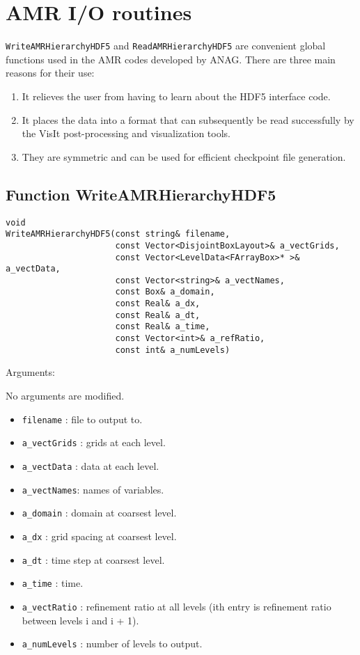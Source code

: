 \section{AMR I/O routines}

\protect\verb|WriteAMRHierarchyHDF5| and  \protect\verb|ReadAMRHierarchyHDF5|
are convenient global functions used in the AMR codes
developed by ANAG.  There are three main reasons for their
use: 

\begin{enumerate}
\item It relieves the user from having to learn about
the HDF5 interface code.
\item It places the data into a format that can subsequently
be read successfully by the VisIt post-processing and visualization 
tools.
\item They are symmetric and can be used for efficient checkpoint
file generation.
\end{enumerate}


\subsection{Function WriteAMRHierarchyHDF5}

\begin{verbatim}
void
WriteAMRHierarchyHDF5(const string& filename, 
                      const Vector<DisjointBoxLayout>& a_vectGrids, 
                      const Vector<LevelData<FArrayBox>* >& a_vectData,
                      const Vector<string>& a_vectNames,
                      const Box& a_domain,                               
                      const Real& a_dx,  
                      const Real& a_dt,
                      const Real& a_time,
                      const Vector<int>& a_refRatio,
                      const int& a_numLevels)
\end{verbatim}

Arguments:

No arguments are modified.
\begin{itemize}
\item \verb|filename| :  file to output to.
\item \verb|a_vectGrids| : grids at each level.
\item \verb|a_vectData| :  data at each level.
\item \verb|a_vectNames|:  names of variables.
\item \verb|a_domain| :  domain at coarsest level.
\item \verb|a_dx|     :  grid spacing at coarsest level.
\item \verb|a_dt|     :  time step at coarsest level.
\item \verb|a_time|     :  time.
\item \verb|a_vectRatio| :  refinement ratio at all levels
(ith entry is refinement ratio between levels i and i + 1).
\item \verb|a_numLevels| :  number of levels to output.
\end{itemize}

